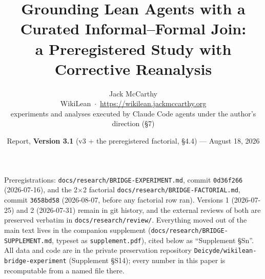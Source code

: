 \documentclass[10pt]{article}
\title{\textbf{Grounding Lean Agents with a Curated Informal--Formal Join:\\
a Preregistered Study with Corrective Reanalysis}}
\author{Jack McCarthy\\
\normalsize WikiLean \,$\cdot$\, \url{https://wikilean.jackmccarthy.org}\\
\normalsize experiments and analyses executed by Claude Code agents under
the author's direction (\S 7)}
\date{\vspace{-0.3em}Report, \textbf{Version 3.1} (v3 + the preregistered factorial, \S 4.4) --- August 18, 2026}
\newcommand{\code}[1]{\texttt{#1}}
\newcommand{\Ssec}[1]{Supplement \S #1}
\begin{document}
\maketitle
\vspace{-1.2em}

\begin{center}
\begin{minipage}{0.92\textwidth}
\footnotesize
Preregistrations: \code{docs/research/BRIDGE-EXPERIMENT.md}, commit
\code{0d36f266} (2026-07-16), and the 2$\times$2 factorial
\code{docs/research/BRIDGE-FACTORIAL.md}, commit \code{3658bd58}
(2026-08-07, before any factorial row ran). Versions 1 (2026-07-25) and
2 (2026-07-31)
remain in git history, and the external reviews of both are preserved
verbatim in \code{docs/research/review/}. Everything moved out of the main
text lives in the companion supplement
(\code{docs/research/BRIDGE-SUPPLEMENT.md}, typeset as
\code{supplement.pdf}), cited below as ``Supplement \S Sn''. All data and
code are in the private preservation repository
\code{Deicyde/wikilean-bridge-experiment} (\Ssec{S14}); every number in
this paper is recomputable from a named file there.
\end{minipage}
\end{center}
\end{document}
